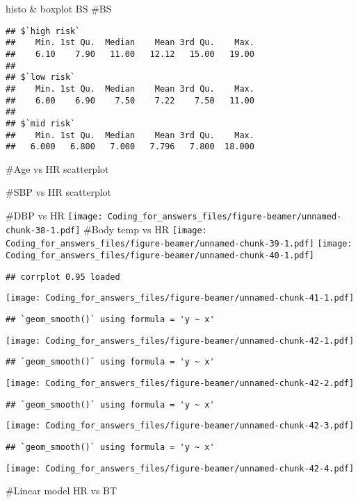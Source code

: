 \documentclass[
  ignorenonframetext,
]{beamer}
\begin{document}
\begin{frame}[fragile]{histo \& boxplot BS}
\#BS

\begin{verbatim}
## $`high risk`
##    Min. 1st Qu.  Median    Mean 3rd Qu.    Max. 
##    6.10    7.90   11.00   12.12   15.00   19.00 
## 
## $`low risk`
##    Min. 1st Qu.  Median    Mean 3rd Qu.    Max. 
##    6.00    6.90    7.50    7.22    7.50   11.00 
## 
## $`mid risk`
##    Min. 1st Qu.  Median    Mean 3rd Qu.    Max. 
##   6.000   6.800   7.000   7.796   7.800  18.000
\end{verbatim}

\#Age vs HR scatterplot

\#SBP vs HR scatterplot

\#DBP vs HR
\texttt{[image: Coding\_for\_answers\_files/figure-beamer/unnamed-chunk-38-1.pdf]}
\#Body temp vs HR
\texttt{[image: Coding\_for\_answers\_files/figure-beamer/unnamed-chunk-39-1.pdf]}
\texttt{[image: Coding\_for\_answers\_files/figure-beamer/unnamed-chunk-40-1.pdf]}

\begin{verbatim}
## corrplot 0.95 loaded
\end{verbatim}

\texttt{[image: Coding\_for\_answers\_files/figure-beamer/unnamed-chunk-41-1.pdf]}

\begin{verbatim}
## `geom_smooth()` using formula = 'y ~ x'
\end{verbatim}

\texttt{[image: Coding\_for\_answers\_files/figure-beamer/unnamed-chunk-42-1.pdf]}

\begin{verbatim}
## `geom_smooth()` using formula = 'y ~ x'
\end{verbatim}

\texttt{[image: Coding\_for\_answers\_files/figure-beamer/unnamed-chunk-42-2.pdf]}

\begin{verbatim}
## `geom_smooth()` using formula = 'y ~ x'
\end{verbatim}

\texttt{[image: Coding\_for\_answers\_files/figure-beamer/unnamed-chunk-42-3.pdf]}

\begin{verbatim}
## `geom_smooth()` using formula = 'y ~ x'
\end{verbatim}

\texttt{[image: Coding\_for\_answers\_files/figure-beamer/unnamed-chunk-42-4.pdf]}

\#Linear model HR vs BT


\end{frame}
\end{document}
